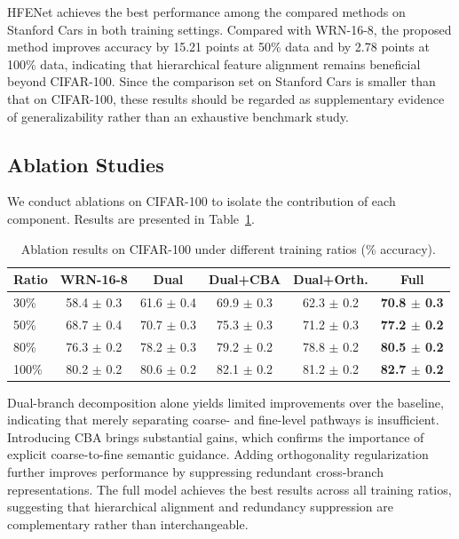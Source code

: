 \documentclass[pdflatex,iicol,sn-mathphys-num]{sn-jnl}
\theoremstyle{thmstyleone}%
\theoremstyle{thmstyletwo}%
\theoremstyle{thmstylethree}%
\begin{document}
HFENet achieves the best performance among the compared methods on Stanford Cars in both training settings. 
Compared with WRN-16-8, the proposed method improves accuracy by 15.21 points at 50\% data and by 2.78 points at 100\% data, indicating that hierarchical feature alignment remains beneficial beyond CIFAR-100. 
Since the comparison set on Stanford Cars is smaller than that on CIFAR-100, these results should be regarded as supplementary evidence of generalizability rather than an exhaustive benchmark study.

\subsection{Ablation Studies}
We conduct ablations on CIFAR-100 to isolate the contribution of each component. Results are presented in Table~\ref{tab:ablation_all}.

\begin{table}[h]
\centering
\caption{Ablation results on CIFAR-100 under different training ratios (\% accuracy).}
\label{tab:ablation_all}
\small
\setlength{\tabcolsep}{4pt}
\renewcommand{\arraystretch}{1.05}
\begin{tabular}{@{}lccccc@{}}
\toprule
\textbf{Ratio} & \textbf{WRN-16-8} & \textbf{Dual} & \textbf{Dual+CBA} & \textbf{Dual+Orth.} & \textbf{Full} \\
\midrule
30\%  & 58.4 $\pm$ 0.3 & 61.6 $\pm$ 0.4 & 69.9 $\pm$ 0.3 & 62.3 $\pm$ 0.2 & \textbf{70.8 $\pm$ 0.3} \\
50\%  & 68.7 $\pm$ 0.4 & 70.7 $\pm$ 0.3 & 75.3 $\pm$ 0.3 & 71.2 $\pm$ 0.3 & \textbf{77.2 $\pm$ 0.2} \\
80\%  & 76.3 $\pm$ 0.2 & 78.2 $\pm$ 0.3 & 79.2 $\pm$ 0.2 & 78.8 $\pm$ 0.2 & \textbf{80.5 $\pm$ 0.2} \\
100\% & 80.2 $\pm$ 0.2 & 80.6 $\pm$ 0.2 & 82.1 $\pm$ 0.2 & 81.2 $\pm$ 0.2 & \textbf{82.7 $\pm$ 0.2} \\
\bottomrule
\end{tabular}
\end{table}

Dual-branch decomposition alone yields limited improvements over the baseline, indicating that merely separating coarse- and fine-level pathways is insufficient. 
Introducing CBA brings substantial gains, which confirms the importance of explicit coarse-to-fine semantic guidance. 
Adding orthogonality regularization further improves performance by suppressing redundant cross-branch representations. 
The full model achieves the best results across all training ratios, suggesting that hierarchical alignment and redundancy suppression are complementary rather than interchangeable.
\end{document}
